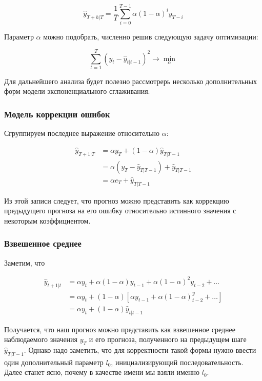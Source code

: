 \documentclass[12pt,fleqn]{article}
\begin{document}
$$
\hat{y}_{T+h|T} = \frac{1}{T}\sum_{i=0}^{T-1} \alpha (1-\alpha)^{i} y_{T-i}
$$

Параметр $\alpha$ можно подобрать, численно решив следующую задачу оптимизации:

$$
\sum_{t=1}^{T}(y_t - \hat{y}_{t|t-1})^2 \rightarrow \min_\alpha
$$

Для дальнейшего анализа будет полезно рассмотрерь несколько дополнительных форм модели экспоненциального сглаживания.

\subsubsection{Модель коррекции ошибок}

Сгруппируем последнее выражение относительно $\alpha$:

\begin{equation}
	\begin{split}
		\hat{y}_{T+1|T} 
		&=  \alpha y_T +(1-\alpha) \hat{y}_{T|T-1} \\
		&= \alpha (y_T - \hat{y}_{T|T-1}) + \hat{y}_{T|T-1} \\
		&= \alpha e_T + \hat{y}_{T|T-1}
	\end{split}
\end{equation}

Из этой записи следует, что прогноз можно представить как коррекцию предыдущего прогноза на его ошибку относительно истинного значения с некоторым коэффициентом.


\subsubsection{Взвешенное среднее}

Заметим, что

\begin{equation}
\begin{split}
	\hat{y}_{t+1|t} 
	&= \alpha y_t + \alpha (1-\alpha) y_{t-1} + \alpha (1-\alpha)^2 y_{t-2} + \ldots \\
	&= \alpha y_t +(1-\alpha)[ \alpha y_{t-1} + \alpha (1-\alpha)^ y_{t-2} + \ldots ] \\
	&=  \alpha y_t +(1-\alpha) \hat{y}_{t|t-1}
\end{split}
\end{equation}

Получается, что наш прогноз можно представить как взвешенное среднее наблюдаемого значения $y_T$ и его прогноза, полученного на предыдущем шаге $\hat{y}_{T|T-1}$. Однако надо заметить, что для корректности такой формы нужно ввести один дополнительный параметр $l_0$, инициализирующий последовательность. Далее станет ясно, почему в качестве имени мы взяли именно $l_0$.
\end{document}
